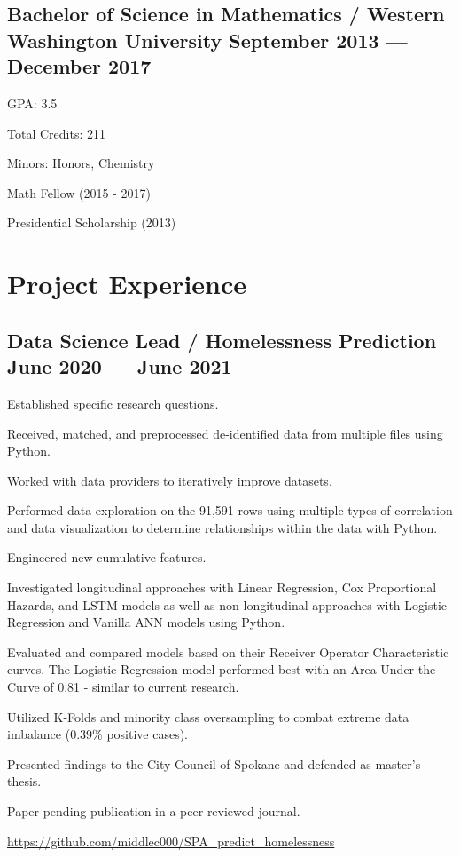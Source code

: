 \documentclass[letter,10pt]{article}
\begin{document}
\subsection{{Bachelor of Science in Mathematics / Western Washington University \hfill September 2013 --- December 2017}}
\begin{zitemize}
    \item GPA: 3.5
    \item Total Credits: 211
    \item Minors: Honors, Chemistry
    \item Math Fellow (2015 - 2017)
    \item Presidential Scholarship (2013)
\end{zitemize}

\section{Project Experience}
\subsection{{Data Science Lead / Homelessness Prediction \hfill June 2020 --- June 2021}}
\begin{zitemize}
    \item Established specific research questions.
    \item Received, matched, and preprocessed de-identified data from multiple files using Python.
    \item Worked with data providers to iteratively improve datasets.
    \item Performed data exploration on the 91,591 rows using multiple types of correlation and data visualization to determine relationships within the data with Python.
    \item Engineered new cumulative features.
    \item Investigated longitudinal approaches with Linear Regression, Cox Proportional Hazards, and LSTM models as well as non-longitudinal approaches with Logistic Regression and Vanilla ANN models using Python.
    \item Evaluated and compared models based on their Receiver Operator Characteristic curves. The Logistic Regression model performed best with an Area Under the Curve of 0.81 - similar to current research.
    \item Utilized K-Folds and minority class oversampling to combat extreme data imbalance (0.39\% positive cases).
    \item Presented findings to the City Council of Spokane and defended as master's thesis. 
    \item Paper pending publication in a peer reviewed journal.
    \item \url{https://github.com/middlec000/SPA_predict_homelessness}
\end{zitemize}
\end{document}
